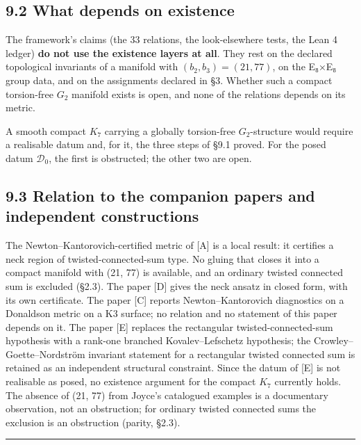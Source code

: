 \documentclass[11pt,a4paper]{article}
\begin{document}
\subsection{9.2 What depends on existence}\label{what-depends-on-existence}

The framework's claims (the 33 relations, the look-elsewhere tests, the Lean 4 ledger) \textbf{do not use the existence layers at all}. They rest on the declared topological invariants of a manifold with \((b_2, b_3) = (21, 77)\), on the E₈×E₈ group data, and on the assignments declared in §3. Whether such a compact torsion-free \(G_2\) manifold exists is open, and none of the relations depends on its metric.

A smooth compact \(K_7\) carrying a globally torsion-free \(G_2\)-structure would require a realisable datum and, for it, the three steps of §9.1 proved. For the posed datum \(\mathcal D_0\), the first is obstructed; the other two are open.

\subsection{9.3 Relation to the companion papers and independent constructions}\label{relation-to-the-companion-papers-and-independent-constructions}

The Newton--Kantorovich-certified metric of {[}A{]} is a local result: it certifies a neck region of twisted-connected-sum type. No gluing that closes it into a compact manifold with (21, 77) is available, and an ordinary twisted connected sum is excluded (§2.3). The paper {[}D{]} gives the neck ansatz in closed form, with its own certificate. The paper {[}C{]} reports Newton--Kantorovich diagnostics on a Donaldson metric on a K3 surface; no relation and no statement of this paper depends on it. The paper {[}E{]} replaces the rectangular twisted-connected-sum hypothesis with a rank-one branched Kovalev--Lefschetz hypothesis; the Crowley--Goette--Nordström invariant statement for a rectangular twisted connected sum \cite{16} is retained as an independent structural constraint. Since the datum of {[}E{]} is not realisable as posed, no existence argument for the compact \(K_7\) currently holds. The absence of (21, 77) from Joyce's catalogued examples is a documentary observation, not an obstruction; for ordinary twisted connected sums the exclusion is an obstruction (parity, §2.3).

\begin{center}\rule{\linewidth}{0.5pt}\end{center}
\end{document}
